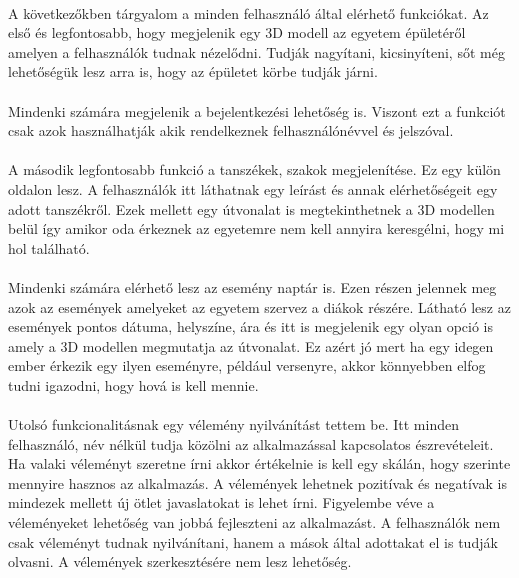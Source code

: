 \documentclass{article}
\begin{document}
	\paragraph{}
	A következőkben tárgyalom a minden felhasználó által elérhető funkciókat. Az első és legfontosabb, hogy megjelenik egy 3D modell az egyetem épületéről amelyen a felhasználók tudnak nézelődni. Tudják nagyítani, kicsinyíteni, sőt még lehetőségük lesz arra is, hogy az épületet körbe tudják járni. 
	\paragraph{}
	Mindenki számára megjelenik a bejelentkezési lehetőség is. Viszont ezt a funkciót csak azok használhatják akik rendelkeznek felhasználónévvel és jelszóval.
	\paragraph{}
	A második legfontosabb funkció a tanszékek, szakok megjelenítése. Ez egy külön oldalon lesz. A felhasználók itt láthatnak egy leírást és annak elérhetőségeit egy adott tanszékről. Ezek mellett egy útvonalat is megtekinthetnek a 3D modellen belül így amikor oda érkeznek az egyetemre nem kell annyira keresgélni, hogy mi hol található. 
	\paragraph{}
	Mindenki számára elérhető lesz az esemény naptár is. Ezen részen jelennek meg azok az események amelyeket az egyetem szervez a diákok részére. Látható lesz az események pontos dátuma, helyszíne, ára és itt is megjelenik egy olyan opció is amely a 3D modellen megmutatja az útvonalat. Ez azért jó mert ha egy idegen ember érkezik egy ilyen eseményre, például versenyre, akkor könnyebben elfog tudni igazodni, hogy hová is kell mennie.
	\paragraph{}
	Utolsó funkcionalitásnak egy vélemény nyilvánítást tettem be. 
	Itt minden felhasználó, név nélkül tudja közölni az alkalmazással kapcsolatos észrevételeit. Ha valaki véleményt szeretne írni akkor értékelnie is kell egy skálán, hogy szerinte mennyire hasznos az alkalmazás. A vélemények lehetnek pozitívak és negatívak is mindezek mellett új ötlet javaslatokat is lehet írni. Figyelembe véve a véleményeket lehetőség van jobbá fejleszteni az alkalmazást. A felhasználók nem csak véleményt tudnak nyilvánítani, hanem a mások által adottakat el is tudják olvasni. A vélemények szerkesztésére nem lesz lehetőség.
\end{document}
